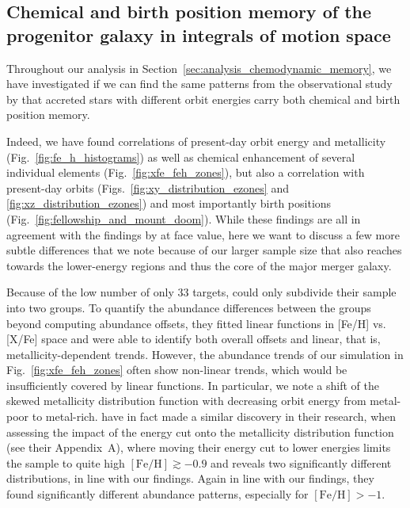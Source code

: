 \documentclass[fleqn,usenatbib]{mnras}
\begin{document}
\subsection{Chemical and birth position memory of the progenitor galaxy in integrals of motion space} \label{sec:discussion_memory}

Throughout our analysis in Section~\ref{sec:analysis_chemodynamic_memory}, we have investigated if we can find the same patterns from the observational study by \citet{Skuladottir2025} that accreted stars with different orbit energies carry both chemical and birth position memory.

Indeed, we have found correlations of present-day orbit energy and metallicity (Fig.~\ref{fig:fe_h_histograms}) as well as chemical enhancement of several individual elements (Fig.~\ref{fig:xfe_feh_zones}), but also a correlation with present-day orbits (Figs.~\ref{fig:xy_distribution_ezones} and \ref{fig:xz_distribution_ezones}) and most importantly birth positions (Fig.~\ref{fig:fellowship_and_mount_doom}). While these findings are all in agreement with the findings by \citet{Skuladottir2025} at face value, here we want to discuss a few more subtle differences that we note because of our larger sample size that also reaches towards the lower-energy regions and thus the core of the major merger galaxy.

Because of the low number of only 33 targets, \citet{Skuladottir2025} could only subdivide their sample into two groups. To quantify the abundance differences between the groups beyond computing abundance offsets, they fitted linear functions in [Fe/H] vs. [X/Fe] space and were able to identify both overall offsets and linear, that is, metallicity-dependent trends. However, the abundance trends of our simulation in Fig.~\ref{fig:xfe_feh_zones} often show non-linear trends, which would be insufficiently covered by linear functions. In particular, we note a shift of the skewed metallicity distribution function with decreasing orbit energy from metal-poor to metal-rich. \citet{Skuladottir2025} have in fact made a similar discovery in their research, when assessing the impact of the energy cut onto the metallicity distribution function (see their Appendix~A), where moving their energy cut to lower energies limits the sample to quite high $\mathrm{[Fe/H]} \gtrsim -0.9$ and reveals two significantly different distributions, in line with our findings. Again in line with our findings, they found significantly different abundance patterns, especially for $\mathrm{[Fe/H]} > -1$.
\end{document}
